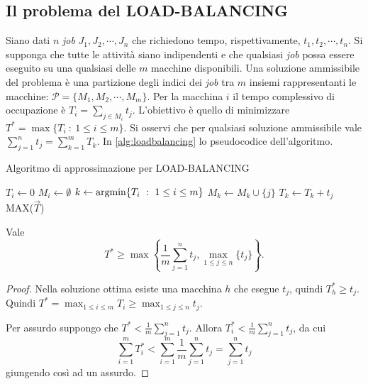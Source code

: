 \subsection{Il problema del LOAD-BALANCING}
Siano dati $n$ \textit{job} $J_1, J_2, \cdots, J_n$ che richiedono tempo, rispettivamente, $t_1, t_2, \cdots, t_n$. Si supponga che tutte le attività siano indipendenti e che qualsiasi \textit{job} possa essere eseguito su una qualsiasi delle $m$ macchine disponibili. Una soluzione ammissibile del problema è una partizione degli indici dei \textit{job} tra $m$ insiemi rappresentanti le macchine: $\mathcal{P}=\{M_1, M_2, \cdots, M_m\}$. Per la macchina $i$ il tempo complessivo di occupazione è $T_i=\sum_{j\in M_i}t_j$. L'obiettivo è quello di minimizzare $T^*=\max\{T_i\ :\ 1\leq i\leq m\}$. Si osservi che per qualsiasi soluzione ammissibile vale $\sum_{j=1}^nt_j=\sum_{k=1}^mT_k$. In \ref{alg:loadbalancing} lo pseudocodice dell'algoritmo.

\begin{algorithm}
\caption{Algoritmo di approssimazione per LOAD-BALANCING}
\label{alg:loadbalancing}
\begin{algorithmic}
      \State $T_i \gets 0$
      \State $M_i \gets \emptyset$
      \EndFor
         \State $k \gets \operatorname*{argmin}\{T_i\ :\ 1\leq i\leq m\}$
         \State $M_k \gets M_k \cup \{j\}$
         \State $T_k \gets T_k + t_j$
      \EndFor
      \State \Return MAX($\vec{T}$)
\EndFunction
\end{algorithmic}
\end{algorithm}

\begin{proposizione}
Vale
\[
T^* \geq \max\left\lbrace\frac{1}{m}\sum_{j=1}^nt_j, \max_{1\leq j \leq n}\{t_j\}\right\rbrace.
\]
\end{proposizione}
\begin{proof}
Nella soluzione ottima esiste una macchina $h$ che esegue $t_j$, quindi $T_h^*\geq t_j$. Quindi $T^*=\max_{1\leq i\leq m}{T_i}\geq\max_{1\leq j\leq n}{t_j}$.

Per assurdo suppongo che $T^*<\frac{1}{m}\sum_{j=1}^n t_j$. Allora $T_i^*<\frac{1}{m}\sum_{j=1}^n t_j$, da cui
\[
\sum_{i=1}^mT_i^*<\sum_{i=1}^m\frac{1}{m}\sum_{j=1}^nt_j=\sum_{j=1}^nt_j
\]
giungendo così ad un assurdo.
\end{proof}

